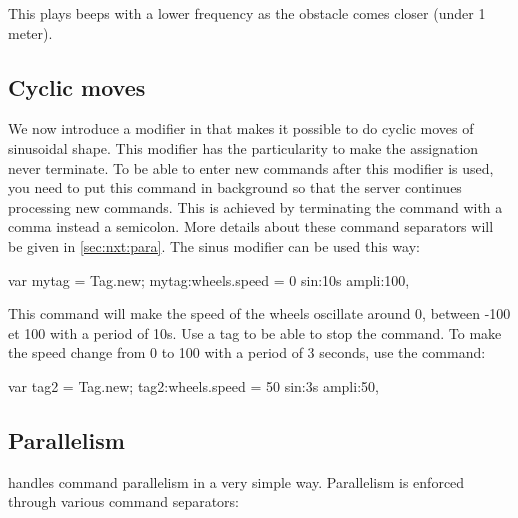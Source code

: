 This plays beeps with a lower frequency as the obstacle comes closer (under 1
meter).

\subsection{Cyclic moves}
We now introduce a modifier in \urbi that makes it possible to do cyclic moves
of sinusoidal shape. This modifier has the particularity to make the
assignation never terminate. To be able to enter new commands after this
modifier is used, you need to put this command in background so that the \urbi
server continues processing new commands. This is achieved by terminating the
command with a comma instead a semicolon. More details about these command
separators will be given in \autoref{sec:nxt:para}.
The sinus modifier can be used this way:
\begin{urbiunchecked}
  var mytag = Tag.new; mytag:wheels.speed = 0 sin:10s ampli:100,
\end{urbiunchecked}

This command will make the speed of the wheels oscillate around 0, between -100
et 100 with a period of 10s. Use a tag to be able to stop the command. To make
the speed change from 0 to 100 with a period of 3 seconds, use the command:
\begin{urbiunchecked}
  var tag2 = Tag.new; tag2:wheels.speed = 50 sin:3s ampli:50,
\end{urbiunchecked}



\subsection{Parallelism}
\label{sec:nxt:para}
\urbi handles command parallelism in a very simple way. Parallelism is enforced
through various command separators:


